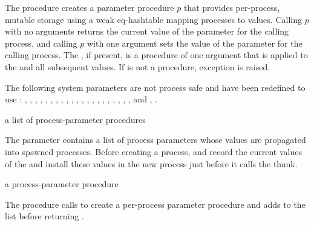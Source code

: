The  procedure creates a parameter
procedure $p$ that provides per-process, mutable storage using a weak
eq-hashtable mapping processes to values. Calling $p$ with no
arguments returns the current value of the parameter for the calling
process, and calling $p$ with one argument sets the value of the
parameter for the calling process. The , if present, is a
procedure of one argument that is applied to the  and all
subsequent values. If  is not a procedure, exception
 is raised.

The following system parameters are not process safe and have
been redefined to use :
,
,
,
,
,
,
,
,
,
,
,
,
,
,
,
,
,
,
,
,
, and
,
.

\begin{parameter}
\end{parameter}
\hasvalue{} a list of process-parameter procedures

The  parameter contains a list of
process parameters whose values are propagated into spawned
processes.
Before creating a process,  and 
record the current values of the 
and install these values in the new process just before it calls
the thunk.

\begin{procedure}
\end{procedure}
\returns{} a process-parameter procedure

The  procedure calls
 to create a per-process
parameter procedure  and adds  to the
 list before returning .

